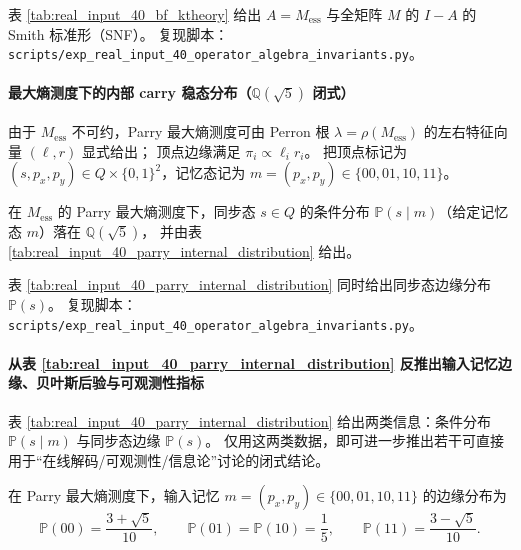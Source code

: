 \begin{remark}\label{rem:real-input-40-bf-ktheory-repro}
表 \ref{tab:real_input_40_bf_ktheory} 给出 $A=M_{\mathrm{ess}}$ 与全矩阵 $M$ 的 $I-A$ 的 Smith 标准形（SNF）。
复现脚本：\texttt{scripts/exp\_real\_input\_40\_operator\_algebra\_invariants.py}。
\end{remark}


\paragraph{最大熵测度下的内部 carry 稳态分布（\texorpdfstring{$\mathbb Q(\sqrt5)$}{Q(sqrt5)} 闭式）}
由于 $M_{\mathrm{ess}}$ 不可约，Parry 最大熵测度可由 Perron 根 $\lambda=\rho(M_{\mathrm{ess}})$ 的左右特征向量 $(\ell,r)$ 显式给出；
顶点边缘满足 $\pi_i\propto \ell_i r_i$。
把顶点标记为 $(s,p_x,p_y)\in Q\times\{0,1\}^2$，记忆态记为 $m=(p_x,p_y)\in\{00,01,10,11\}$。

\begin{proposition}[真实输入核的内部同步态条件分布（闭式）]\label{prop:real-input-40-parry-internal-distribution}
在 $M_{\mathrm{ess}}$ 的 Parry 最大熵测度下，同步态 $s\in Q$ 的条件分布 $\mathbb{P}(s\mid m)$（给定记忆态 $m$）落在 $\mathbb Q(\sqrt5)$，
并由表 \ref{tab:real_input_40_parry_internal_distribution} 给出。
\end{proposition}

\begin{remark}\label{rem:real-input-40-parry-internal-distribution-repro}
表 \ref{tab:real_input_40_parry_internal_distribution} 同时给出同步态边缘分布 $\mathbb{P}(s)$。
复现脚本：\texttt{scripts/exp\_real\_input\_40\_operator\_algebra\_invariants.py}。
\end{remark}


\paragraph{从表 \ref{tab:real_input_40_parry_internal_distribution} 反推出输入记忆边缘、贝叶斯后验与可观测性指标}
表 \ref{tab:real_input_40_parry_internal_distribution} 给出两类信息：条件分布 $\mathbb{P}(s\mid m)$ 与同步态边缘 $\mathbb{P}(s)$。
仅用这两类数据，即可进一步推出若干可直接用于“在线解码/可观测性/信息论”讨论的闭式结论。

\begin{proposition}[输入记忆边缘分布的闭式反推]\label{prop:real-input-40-memory-marginal}
在 Parry 最大熵测度下，输入记忆 $m=(p_x,p_y)\in\{00,01,10,11\}$ 的边缘分布为
\[
\mathbb{P}(00)=\frac{3+\sqrt5}{10},\qquad
\mathbb{P}(01)=\mathbb{P}(10)=\frac15,\qquad
\mathbb{P}(11)=\frac{3-\sqrt5}{10}.
\]
\end{proposition}

